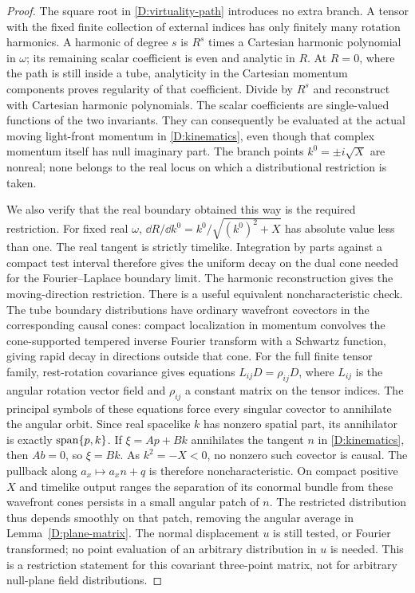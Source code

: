 \begin{proof}
The square root in \eqref{D:virtuality-path} introduces no extra
branch.  A tensor with the fixed finite collection of external
indices has only finitely many rotation harmonics.  A harmonic of
degree $s$ is $R^s$ times a Cartesian harmonic polynomial in
$\omega$; its remaining scalar coefficient is even and analytic in
$R$.  At $R=0$, where the path is still inside a tube, analyticity
in the Cartesian momentum components proves regularity of that
coefficient.  Divide by $R^s$ and reconstruct with Cartesian harmonic
polynomials.  The scalar coefficients are single-valued functions of
the two invariants.  They can consequently be evaluated at the
actual moving light-front momentum in \eqref{D:kinematics}, even
though that complex momentum itself has null imaginary part.
The branch points $k^0=\pm i\sqrt X$ are nonreal; none belongs
to the real locus on which a distributional restriction is taken.

We also verify that the real boundary obtained this way is the
required restriction.  For fixed real $\omega$,
$\dd R/\dd k^0=k^0/\sqrt{(k^0)^2+X}$ has absolute value less than
one.  The real tangent is strictly timelike.  Integration by parts
against a compact test interval therefore gives the uniform decay
on the dual cone needed for the Fourier--Laplace boundary limit.
The harmonic reconstruction gives the moving-direction restriction.
There is a useful equivalent noncharacteristic check.  The tube
boundary distributions have ordinary wavefront covectors in the
corresponding causal cones: compact localization in momentum
convolves the cone-supported tempered inverse Fourier transform
with a Schwartz function, giving rapid decay in directions outside
that cone.  For the full finite tensor family, rest-rotation
covariance gives equations $L_{ij}D=\rho_{ij}D$, where $L_{ij}$
is the angular rotation vector field and $\rho_{ij}$ a constant
matrix on the tensor indices.  The principal symbols of these
equations force every singular covector to annihilate the angular
orbit.  Since real spacelike $k$ has nonzero spatial part, its
annihilator is exactly $\operatorname{span}\{p,k\}$.  If
$\xi=A p+B k$ annihilates the tangent $n$ in
\eqref{D:kinematics}, then $A b=0$, so $\xi=B k$.  As $k^2=-X<0$,
no nonzero such covector is causal. The pullback along
$a_x\mapsto a_xn+q$ is therefore noncharacteristic. On compact
positive $X$ and timelike output ranges the separation of its conormal
bundle from these wavefront cones persists in a small angular patch
of $n$. The restricted distribution thus depends smoothly on that
patch, removing the angular average in Lemma~\ref{D:plane-matrix}.
The normal displacement $u$ is still tested, or Fourier transformed;
no point evaluation of an arbitrary distribution in $u$ is needed.
This is a restriction
statement for this covariant three-point matrix, not for arbitrary
null-plane field distributions.


\end{proof}
